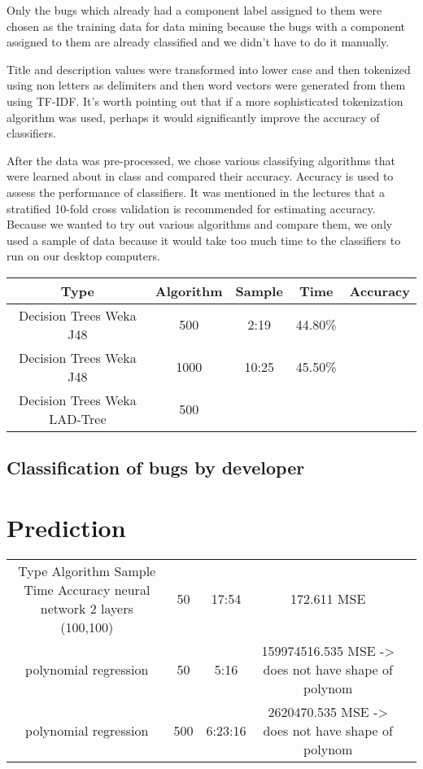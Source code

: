Only the bugs which already had a component label assigned to them were chosen as the training data for data mining because the bugs with a component assigned to them are already classified and we didn't have to do it manually.

Title and description values were transformed into lower case and then tokenized using non letters as delimiters and then word vectors were generated from them using TF-IDF. It's worth pointing out that if a more sophisticated tokenization algorithm was used, perhaps it would significantly improve the accuracy of classifiers.

After the data was pre-processed, we chose various classifying algorithms that were learned about in class and compared their accuracy. Accuracy is used to assess the performance of classifiers. It was mentioned in the lectures that a stratified 10-fold cross validation is recommended for estimating accuracy. Because we wanted to try out various algorithms and compare them, we only used a sample of data because it would take too much time to the classifiers to run on our desktop computers.

\begin{tabular}{|c|c|c|c|c|}
\hline
Type     &       Algorithm   & Sample &  Time &  Accuracy   \\
\hline
\hline
Decision Trees   Weka J48    &  500  &   2:19 &    44.80\%  \\
Decision Trees   Weka J48    & 1000  &  10:25 &    45.50\%  \\
Decision Trees   Weka LAD-Tree &  500  &        &           \\
\hline
\end{tabular}


\subsection{Classification of bugs by developer} %
\label{sub:Classification of bugs bugs by developer}


\section{Prediction} %
\label{sub:Prediction}

\begin{tabular}{|c|c|c|c|c|}
\hline
Type             Algorithm         Sample    Time    Accuracy
\hline
\hline
neural network 2 layers (100,100)  & 50     &  17:54 & 172.611 MSE \\
polynomial regression              & 50     &  5:16  & 159974516.535  MSE  -> does not have shape of polynom\\
polynomial regression              & 500    &  6:23:16 & 2620470.535  MSE  -> does not have shape of polynom\\
\hline
\end{tabular}


